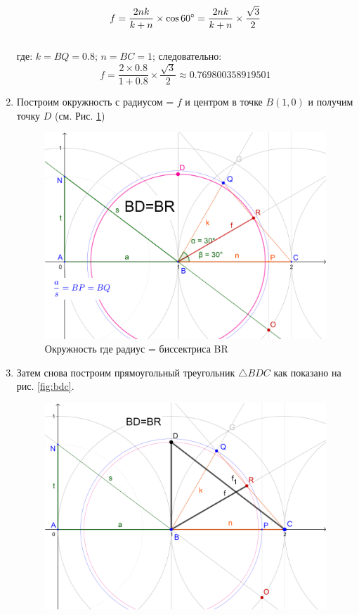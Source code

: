 \documentclass[12pt, letterpaper, oneside]{report}
\begin{document}
\begin{enumerate}
\begin{equation}
f=\frac{2nk}{k+n}\times \cos 60\degree = \frac{2nk}{k+n}\times\frac{\sqrt{3}}{2}
\end{equation}\\
	где:  $k=BQ=0.8$; $n=BC=1$; следовательно:
\begin{equation}	
f=\frac{2\times0.8}{1+0.8}\times\frac{\sqrt{3}}{2}\approx 0.769800358919501
\end{equation}
	\item Построим окружность с радиусом = $f$ и центром в точке $B(1,0)$ и получим точку $D$ (см. Рис. \ref{circle})
\begin{figure}[h]
	\centerline{\includegraphics[scale=0.1]{img/bdBR.png}}
	\caption{Окружность где радиус = биссектриса BR}
	\label{circle}
\end{figure} 	
\newpage
	\item Затем снова построим прямоугольный треугольник $\triangle BDC$ как показано на рис. \ref{fig:bdc}.
\begin{figure}[h]
	\centerline{\includegraphics[scale=0.14]{img/BDC.png}}

\end{figure}
\end{enumerate}
\end{document}

